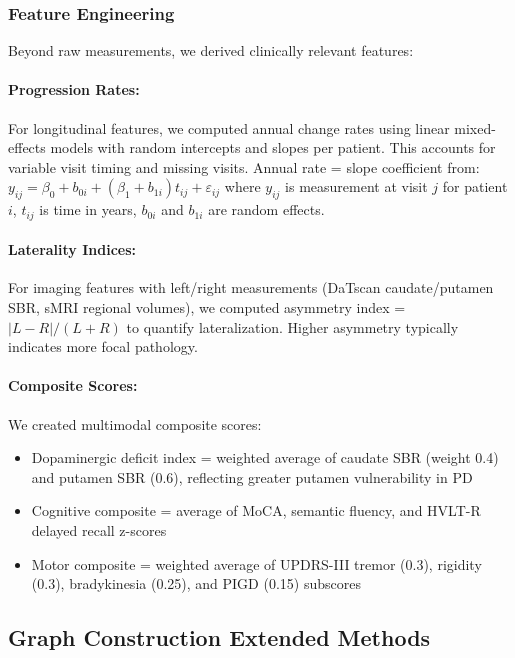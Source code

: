 \documentclass[11pt]{article}
\begin{document}
\subsubsection{Feature Engineering}
Beyond raw measurements, we derived clinically relevant features:

\paragraph{Progression Rates:} For longitudinal features, we computed annual change rates using linear mixed-effects models with random intercepts and slopes per patient. This accounts for variable visit timing and missing visits. Annual rate = slope coefficient from: $y_{ij} = \beta_0 + b_{0i} + (\beta_1 + b_{1i})t_{ij} + \varepsilon_{ij}$ where $y_{ij}$ is measurement at visit $j$ for patient $i$, $t_{ij}$ is time in years, $b_{0i}$ and $b_{1i}$ are random effects.

\paragraph{Laterality Indices:} For imaging features with left/right measurements (DaTscan caudate/putamen SBR, sMRI regional volumes), we computed asymmetry index = $|L - R| / (L + R)$ to quantify lateralization. Higher asymmetry typically indicates more focal pathology.

\paragraph{Composite Scores:} We created multimodal composite scores:
\begin{itemize}
    \item Dopaminergic deficit index = weighted average of caudate SBR (weight 0.4) and putamen SBR (0.6), reflecting greater putamen vulnerability in PD
    \item Cognitive composite = average of MoCA, semantic fluency, and HVLT-R delayed recall z-scores
    \item Motor composite = weighted average of UPDRS-III tremor (0.3), rigidity (0.3), bradykinesia (0.25), and PIGD (0.15) subscores
\end{itemize}

\subsection{Graph Construction Extended Methods}
\end{document}
